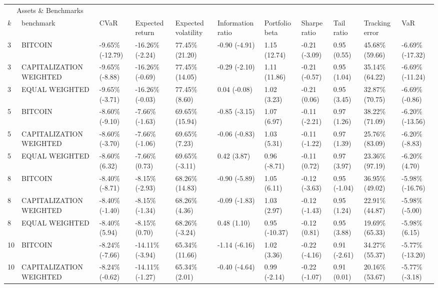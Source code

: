 \documentclass{article}
\begin{document}
\begin{landscape}
\begin{table}[H]
  \centering
  \begin{tabular}{p{0.4cm}|p{3cm}|p{1.65cm}|p{1.65cm}|p{1.65cm}|p{1.65cm}|p{1.65cm}|p{1.65cm}|p{1.65cm}|p{1.65cm}|p{1.65cm}}%
    \toprule
    \multicolumn{2}{c}{Assets \& Benchmarks}                   \\
    \cmidrule(r){1-2}
    $k$ & benchmark & CVaR & Expected return & Expected volatility&Information ratio&Portfolio beta&Sharpe ratio&Tail ratio&Tracking error&VaR\\
    \midrule 
3&BITCOIN&-9.65\% (-12.79)&-16.26\% (-2.24)&77.45\% (21.20)&-0.90 (-4.91)&1.15 (12.74)&-0.21 (-3.09)&0.95 (0.55)&45.68\% (59.66)&-6.69\% (-17.32)
\\ 
3&CAPITALIZATION WEIGHTED&-9.65\% (-8.88)&-16.26\% (-0.69)&77.45\% (14.05)&-0.29 (-2.10)&1.11 (11.86)&-0.21 (-0.57)&0.95 (1.04)&35.14\% (64.22)&-6.69\% (-11.24)
\\ 
3&EQUAL WEIGHTED&-9.65\% (-3.71)&-16.26\% (-0.03)&77.45\% (8.60)&0.04 (-0.08)&1.02 (3.23)&-0.21 (0.06)&0.95 (3.45)&32.87\% (70.75)&-6.69\% (-0.86)
\\ 
5&BITCOIN&-8.60\% (-9.10)&-7.66\% (-1.63)&69.65\% (15.94)&-0.85 (-3.15)&1.07 (6.97)&-0.11 (-2.21)&0.97 (1.26)&38.22\% (71.09)&-6.20\% (-13.56)
\\ 
5&CAPITALIZATION WEIGHTED&-8.60\% (-3.70)&-7.66\% (-1.06)&69.65\% (7.23)&-0.06 (-0.83)&1.03 (5.31)&-0.11 (-1.22)&0.97 (1.39)&25.76\% (83.09)&-6.20\% (-8.83)
\\ 
5&EQUAL WEIGHTED&-8.60\% (6.32)&-7.66\% (0.73)&69.65\% (-3.11)&0.42 (3.87)&0.96 (-8.71)&-0.11 (0.72)&0.97 (3.97)&23.36\% (97.19)&-6.20\% (4.70)
\\ 
8&BITCOIN&-8.40\% (-8.71)&-8.15\% (-2.93)&68.26\% (14.83)&-0.90 (-5.89)&1.05 (6.11)&-0.12 (-3.63)&0.95 (-1.04)&36.95\% (49.02)&-5.98\% (-16.76)
\\ 
8&CAPITALIZATION WEIGHTED&-8.40\% (-1.40)&-8.15\% (-1.34)&68.26\% (4.36)&-0.09 (-1.83)&1.03 (2.97)&-0.12 (-1.43)&0.95 (1.24)&22.91\% (44.87)&-5.98\% (-5.00)
\\ 
8&EQUAL WEIGHTED&-8.40\% (5.94)&-8.15\% (0.70)&68.26\% (-3.24)&0.48 (1.10)&0.95 (-10.37)&-0.12 (0.81)&0.95 (3.88)&19.69\% (65.33)&-5.98\% (6.15)
\\ 
10&BITCOIN&-8.24\% (-7.66)&-14.11\% (-3.94)&65.34\% (11.66)&-1.14 (-6.16)&1.02 (3.36)&-0.22 (-4.16)&0.91 (-2.61)&34.27\% (55.37)&-5.77\% (-13.20)
\\ 
10&CAPITALIZATION WEIGHTED&-8.24\% (-0.62)&-14.11\% (-1.27)&65.34\% (2.01)&-0.40 (-4.64)&0.99 (-2.14)&-0.22 (-1.07)&0.91 (0.01)&20.16\% (53.67)&-5.77\% (-3.18)

\end{tabular}
\end{table}
\end{landscape}
\end{document}
